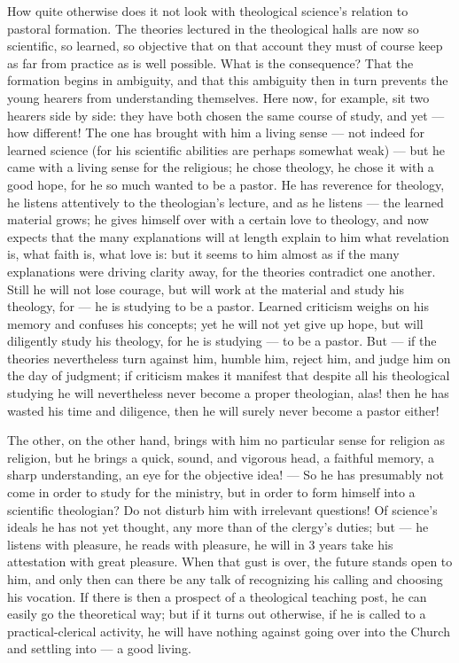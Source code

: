 \documentclass[12pt,a4paper]{book}
\begin{document}
How quite otherwise does it not look with theological science's relation to pastoral formation.
The theories lectured in the theological halls are now so scientific, so learned, so objective
that on that account they must of course keep as far from practice as is well possible. What is
the consequence? That the formation begins in ambiguity, and that this ambiguity then in turn
prevents the young hearers from understanding themselves. Here now, for example, sit two hearers
side by side: they have both chosen the same course of study, and yet --- how different! The one
has brought with him a living sense --- not indeed for learned science (for his scientific
abilities are perhaps somewhat weak) --- but he came with a living sense for the religious; he
chose theology, he chose it with a good hope, for he so much wanted to be a pastor. He has
reverence for theology, he listens attentively to the theologian's lecture, and as he listens ---
the learned material grows; he gives himself over with a certain love to theology, and now expects
that the many explanations will at length explain to him what revelation is, what faith is, what
love is: but it seems to him almost
as if the many explanations were driving clarity away, for the theories contradict one another.
Still he will not lose courage, but will work at the material and study his theology, for --- he
is studying to be a pastor. Learned criticism weighs on his memory and confuses his concepts; yet
he will not yet give up hope, but will diligently study his theology, for he is studying --- to be
a pastor. But --- if the theories nevertheless turn against him, humble him, reject him, and judge
him on the day of judgment; if criticism makes it manifest that despite all his theological
studying he will nevertheless never become a proper theologian, alas! then he has wasted his time
and diligence, then he will surely never become a pastor either!

The other, on the other hand, brings with him no particular sense for religion as religion, but he
brings a quick, sound, and vigorous head, a faithful memory, a sharp understanding, an eye for the
objective idea! --- So he has presumably not come in order to study for the ministry, but in order
to form himself into a scientific theologian? Do not disturb him with irrelevant questions! Of
science's ideals he has not yet thought, any more than of the clergy's duties; but --- he listens
with pleasure, he reads with pleasure, he will in 3 years take his attestation with great
pleasure. When that gust is over, the future stands open to him, and only then can there be any
talk of recognizing his calling and choosing his vocation. If there is then a prospect of a
theological teaching post, he can easily go the theoretical way; but if it turns out otherwise, if
he is called to a practical-clerical activity, he will have nothing against going over into the
Church and settling into --- a good living.
\end{document}
